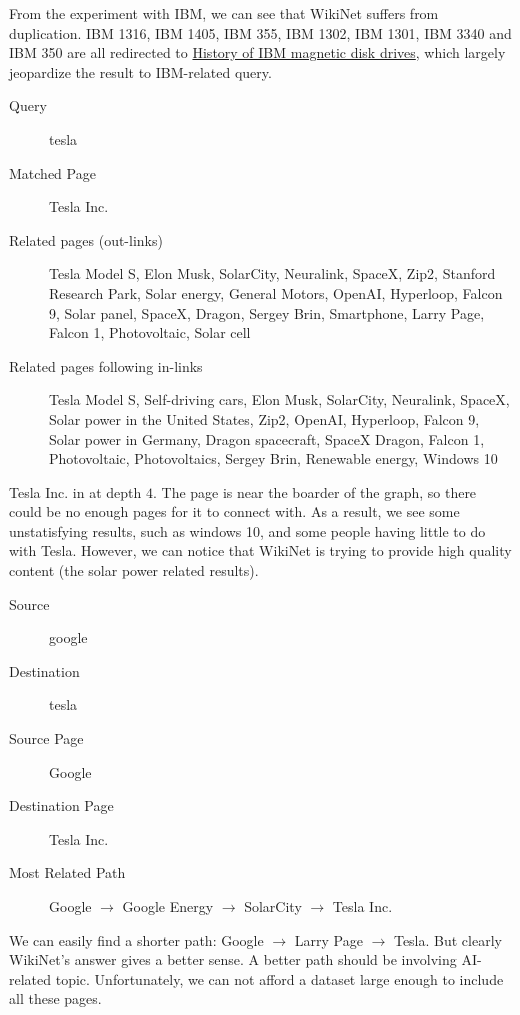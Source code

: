 \documentclass[12pt]{amsart}
\newcommand{\0}{\mat{0}}
\newcommand{\1}{\mathds{1}}
\begin{document}
From the experiment with IBM, we can see that WikiNet suffers from duplication. {\color{red}IBM 1316, IBM 1405, IBM 355, IBM 1302, IBM 1301, IBM 3340} and {\color{red}IBM 350} are all redirected to \href{https://en.wikipedia.org/wiki/History_of_IBM_magnetic_disk_drives}{History of IBM magnetic disk drives}, which largely jeopardize the result to IBM-related query. 




\begin{description}
\item[Query] tesla
\item[Matched Page] Tesla Inc.
\item[Related pages (out-links)] Tesla Model S, Elon Musk, SolarCity, Neuralink, SpaceX, Zip2, Stanford Research Park, Solar energy, General Motors, OpenAI, Hyperloop, Falcon 9, Solar panel, SpaceX, Dragon, Sergey Brin, Smartphone, Larry Page, Falcon 1, Photovoltaic, Solar cell
\item[Related pages following in-links] Tesla Model S, Self-driving cars, Elon Musk, SolarCity, Neuralink, SpaceX, Solar power in the United States, Zip2, OpenAI, Hyperloop, Falcon 9, Solar power in Germany, Dragon spacecraft, SpaceX Dragon, Falcon 1, Photovoltaic, Photovoltaics, Sergey Brin, Renewable energy, Windows 10
\end{description}

Tesla Inc. in at depth $4$. The page is near the boarder of the graph, so there could be no enough pages for it to connect with. As a result, we see some unstatisfying results, such as windows 10, and some people having little to do with Tesla. However, we can notice that WikiNet is trying to provide high quality content (the solar power related results). 

\begin{description}
\item[Source] google
\item[Destination] tesla
\item[Source Page] Google
\item[Destination Page] Tesla Inc.
\item[Most Related Path] Google $\rightarrow$ Google Energy $\rightarrow$ SolarCity $\rightarrow$ Tesla Inc.
\end{description}

We can easily find a shorter path: Google $\rightarrow$ Larry Page $\rightarrow$ Tesla. But clearly WikiNet's answer gives a better sense. A better path should be involving AI-related topic. Unfortunately, we can not afford a dataset large enough to include all these pages. 
\end{document}
